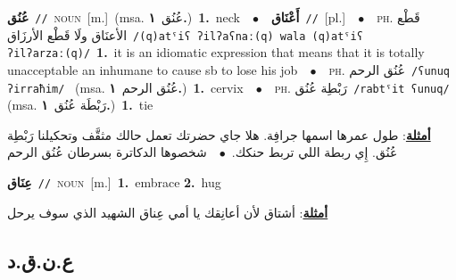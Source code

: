 \documentclass[10pt,a4paper,twoside]{article} %
\begin{document}
\begin{multicols}{2}
{\setlength\topsep{0pt}\textbf{\foreignlanguage{arabic}{عُنُق}}\ {\color{gray}\texttt{//}\color{black}}\ \textsc{noun}\ [m.]\ \color{gray}(msa. \foreignlanguage{arabic}{عُنُق}~\foreignlanguage{arabic}{\textbf{١.}})\color{black}\ \textbf{1.}~neck\ \ $\bullet$\ \ \setlength\topsep{0pt}\textbf{\foreignlanguage{arabic}{أَعْنَاق}}\ {\color{gray}\texttt{//}\color{black}}\ [pl.]\ \ $\bullet$\ \ \textsc{ph.} \color{gray} \foreignlanguage{arabic}{قَطْع الأعنَاق ولَا قَطْع الأرزَاق}\color{black}\ {\color{gray}\texttt{/{\sffamily (q)atˤiʕ ʔilʔaʕnaː(q) wala (q)atˤiʕ ʔilʔarzaː(q)}/}\color{black}}\ \textbf{1.}~it is an idiomatic expression that means that it is totally unacceptable an inhumane to cause sb to lose his job\ \ $\bullet$\ \ \textsc{ph.} \color{gray} \foreignlanguage{arabic}{عُنُق الرحم}\color{black}\ {\color{gray}\texttt{/{\sffamily ʕunuq ʔirraħim}/}\color{black}}\ \color{gray} (msa. \foreignlanguage{arabic}{عُنُق الرحم}~\foreignlanguage{arabic}{\textbf{١.}})\color{black}\ \textbf{1.}~cervix\ \ $\bullet$\ \ \textsc{ph.} \color{gray} \foreignlanguage{arabic}{رَبْطِة عُنُق}\color{black}\ {\color{gray}\texttt{/{\sffamily rabtˤit ʕunuq}/}\color{black}}\ \color{gray} (msa. \foreignlanguage{arabic}{رَبْطَة عُنُق}~\foreignlanguage{arabic}{\textbf{١.}})\color{black}\ \textbf{1.}~tie\  \begin{flushright}\color{gray}\foreignlanguage{arabic}{\textbf{\underline{\foreignlanguage{arabic}{أمثلة}}}: طول عمرها اسمها جرافِة. هلا جاي حضرتك تعمل حالك مثقَّف وتحكيلنا رَبْطِة عُنُق. إِي ربطة اللي تربط حنكك.\ $\bullet$\ \  شخصوها الدكاترة بسرطان عُنُق الرحم}\end{flushright}\color{black}} \vspace{2mm}

{\setlength\topsep{0pt}\textbf{\foreignlanguage{arabic}{عِنَاق}}\ {\color{gray}\texttt{//}\color{black}}\ \textsc{noun}\ [m.]\ \textbf{1.}~embrace  \textbf{2.}~hug\  \begin{flushright}\color{gray}\foreignlanguage{arabic}{\textbf{\underline{\foreignlanguage{arabic}{أمثلة}}}: أشتاق لأن أعانِقك يا أمي عِناق الشهيد الذي سوف يرحل}\end{flushright}\color{black}} \vspace{2mm}

\vspace{-3mm}
\subsection*{\color{blue}\foreignlanguage{arabic}{ع.ن.ق.د}\color{blue}{}} 


\end{multicols}
\end{document}
